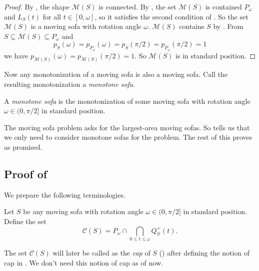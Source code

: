\begin{proof}
By , the shape \(\mathcal{M}(S)\) is connected. By , the set \(\mathcal{M}(S)\) is contained \(P_\omega\) and \(L_S(t)\) for all \(t \in [0, \omega]\), so it satisfies the second condition of . So the set \(\mathcal{M}(S)\) is a moving sofa with rotation angle \(\omega\). \(\mathcal{M}(S)\) contains \(S\) by . From \(S \subseteq \mathcal{M}(S) \subseteq P_\omega\) and
\[
p_S(\omega) = p_{P_\omega}(\omega) = p_S(\pi/2) = p_{P_\omega}(\pi/2) = 1
\]
we have \(p_{\mathcal{M}(S)}(\omega) = p_{\mathcal{M}(S)}(\pi/2) = 1\). So \(\mathcal{M}(S)\) is in standard position.
\end{proof}

Now any monotonization of a moving sofa is also a moving sofa. Call the resulting monotonization a \emph{monotone sofa}.

\begin{definition}

A \emph{monotone sofa} is the monotonization of some moving sofa with rotation angle \(\omega \in (0, \pi/2]\) in standard position.

\label{def:monotone-sofa}
\end{definition}

The moving sofa problem asks for the largest-area moving sofas. So  tells us that we only need to consider monotone sofas for the problem. The rest of this  proves  as promised.

\subsection{\texorpdfstring{Proof of }{Proof of }}

We prepare the following terminologies.

\begin{definition}

Let \(S\) be any moving sofa with rotation angle \(\omega \in (0, \pi/2]\) in standard position. Define the set
\[
\mathcal{C}(S) = P_\omega \cap \bigcap_{0 \leq t \leq \omega} Q^+_S(t).
\]

\label{def:cap-sofa}
\end{definition}

The set \(\mathcal{C}(S)\) will later be called as the \emph{cap} of \(S\) () after defining the notion of cap in . We don’t need this notion of cap as of now.

